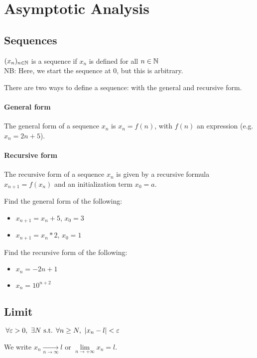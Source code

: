 \section{Asymptotic Analysis}

\subsection{Sequences}
\begin{definition}[Sequence]
	$(x_n)_{n\in \mathbb{N}}$ is a sequence if $x_n$ is defined for all $n \in \mathbb{N}$\\
    NB: Here, we start the sequence at $0$, but this is arbitrary.
\end{definition}
There are two ways to define a sequence: with the general and recursive form.

\paragraph{General form}
The general form of a sequence $x_n$ is $x_n = f(n)$, with $f(n)$ an expression (e.g. $x_n = 2n+5$).
\paragraph{Recursive form}
The recursive form of a sequence $x_n$ is given by a recursive formula $x_{n+1} = f(x_n)$ and an initialization term $x_0 = a$.

\begin{question}
    Find the general form of the following:
    \begin{itemize}
        \item $x_{n+1} = x_n+5$, $x_0=3$
        \item $x_{n+1} = x_n*2$, $x_0=1$
    \end{itemize}
\end{question}
\begin{question}
    Find the recursive form of the following:
    \begin{itemize}
        \item $x_n = -2n+1$
        \item $x_n = 10^{n+2}$
    \end{itemize}
\end{question}



\subsection{Limit}
\begin{definition}
    $\,\forall \varepsilon > 0, \ \exists N \text{ s.t. } \forall n \geq N, \ | x_n-l | < \varepsilon$
\end{definition}
We write $x_n \xrightarrow[n \to \infty]{} l \text{ or } \lim\limits_{n \to +\infty} x_n = l$.

